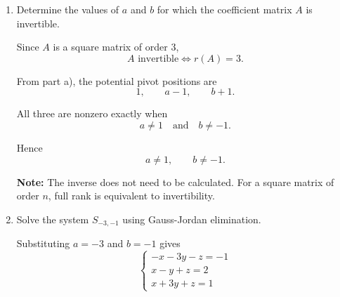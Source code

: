 \begin{enumerate}[label=\alph*)]
\begin{answer}
    Every homogeneous system admits the trivial solution $X=0$.

    A nonzero solution exists if and only if
    $$
    r(A)<n=3.
    $$

    This happens when at least one of the last two potential pivots vanishes:
    $$
    a-1=0
    \quad\text{or}\quad
    b+1=0.
    $$

    Therefore,
    $$
    \boxed{a=1\quad\text{or}\quad b=-1}.
    $$

    More precisely,
    $$
    \begin{array}{c|c|c}
    \text{Conditions}&r(A)&
    \text{Degree}\\
    \hline
    a\neq1,\ b\neq-1&3&0\\
    a=1,\ b\neq-1&2&1\\
    a\neq1,\ b=-1&2&1\\
    a=1,\ b=-1&1&2
    \end{array}
    $$

    {\color{red}
    \textbf{Note:} The homogeneous system is always consistent,
    even if the original system is inconsistent.
    It admits nonzero solutions precisely when $r(A)<n$.}
\end{answer}

\item Determine the values of $a$
and $b$ for which the coefficient
matrix $A$ is invertible.

\begin{answer}
    Since $A$ is a square matrix
    of order $3$,
    $$
    A\text{ invertible}
    \iff r(A)=3.
    $$

    From part a), the potential
    pivot positions are
    $$
    1,\qquad a-1,\qquad b+1.
    $$

    All three are nonzero exactly when
    $$
    a\neq1
    \quad\text{and}\quad
    b\neq-1.
    $$

    Hence
    $$
    \boxed{a\neq1,\qquad b\neq-1}.
    $$

    {\color{red}
    \textbf{Note:} The inverse does not
    need to be calculated. For a square
    matrix of order $n$, full rank
    is equivalent to invertibility.
    }
\end{answer}

\item Solve the system $S_{-3,-1}$
using Gauss-Jordan elimination.

\begin{answer}
    Substituting $a=-3$ and $b=-1$
    gives
    $$
    \begin{cases}
    -x-3y-z=-1\\
    x-y+z=2\\
    x+3y+z=1
    \end{cases}
    $$


\end{answer}
\end{enumerate}
